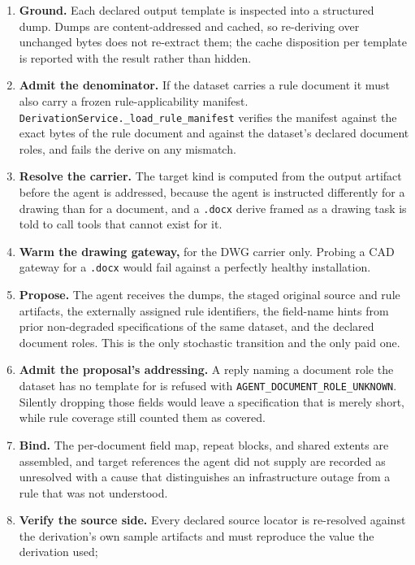 \begin{enumerate}
  \item \textbf{Ground.} Each declared output template is inspected into a structured dump.
    Dumps are content-addressed and cached, so re-deriving over unchanged bytes does not
    re-extract them; the cache disposition per template is reported with the result rather
    than hidden.
  \item \textbf{Admit the denominator.} If the dataset carries a rule document it must also
    carry a frozen rule-applicability manifest.
    \texttt{DerivationService.\_load\_rule\_manifest} verifies the manifest against the
    exact bytes of the rule document and against the dataset's declared document roles, and
    fails the derive on any mismatch.
  \item \textbf{Resolve the carrier.} The target kind is computed from the output artifact
    before the agent is addressed, because the agent is instructed differently for a drawing
    than for a document, and a \texttt{.docx} derive framed as a drawing task is told to call
    tools that cannot exist for it.
  \item \textbf{Warm the drawing gateway,} for the DWG carrier only. Probing a CAD gateway
    for a \texttt{.docx} would fail against a perfectly healthy installation.
  \item \textbf{Propose.} The agent receives the dumps, the staged original source and rule
    artifacts, the externally assigned rule identifiers, the field-name hints from prior
    non-degraded specifications of the same dataset, and the declared document roles. This is
    the only stochastic transition and the only paid one.
  \item \textbf{Admit the proposal's addressing.} A reply naming a document role the dataset
    has no template for is refused with \texttt{AGENT\_DOCUMENT\_ROLE\_UNKNOWN}. Silently
    dropping those fields would leave a specification that is merely short, while rule
    coverage still counted them as covered.
  \item \textbf{Bind.} The per-document field map, repeat blocks, and shared extents are
    assembled, and target references the agent did not supply are recorded as unresolved with
    a cause that distinguishes an infrastructure outage from a rule that was not understood.
  \item \textbf{Verify the source side.} Every declared source locator is re-resolved against
    the derivation's own sample artifacts and must reproduce the value the derivation used;

\end{enumerate}
